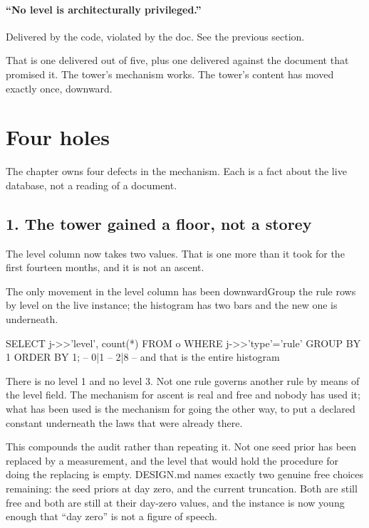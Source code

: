 \paragraph{``No level is architecturally privileged.''} Delivered by the code, violated by the doc. See the previous section.

That is one delivered out of five, plus one delivered against the document that promised it. The tower's mechanism works. The tower's content has moved exactly once, downward.

\section{Four holes}
\label{sec:holes}

The chapter owns four defects in the mechanism. Each is a fact about the live database, not a reading of a document.

\subsection*{1. The tower gained a floor, not a storey}

The level column now takes two values. That is one more than it took for the first fourteen months, and it is not an ascent.

\begin{Correspondence}{The only movement in the level column has been downward}{Group the rule rows by level on the live instance; the histogram has two bars and the new one is underneath.}
\begin{Check}
SELECT j->>'level', count(*) FROM o WHERE j->>'type'='rule' GROUP BY 1 ORDER BY 1;
-- 0|1
-- 2|8
-- and that is the entire histogram
\end{Check}
There is no level 1 and no level 3. Not one rule governs another rule by means of the level field. The mechanism for ascent is real and free and nobody has used it; what has been used is the mechanism for going the other way, to put a declared constant underneath the laws that were already there.
\end{Correspondence}

This compounds the audit rather than repeating it. Not one seed prior has been replaced by a measurement, and the level that would hold the procedure for doing the replacing is empty. DESIGN.md names exactly two genuine free choices remaining: the seed priors at day zero, and the current truncation. Both are still free and both are still at their day-zero values, and the instance is now young enough that ``day zero'' is not a figure of speech.

